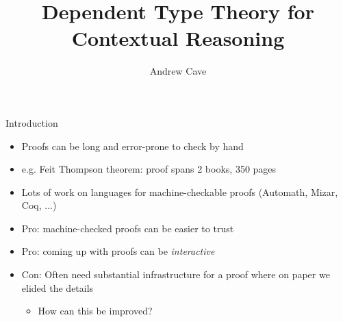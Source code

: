 \documentclass[usenames,dvipsnames]{beamer}
\author{Andrew Cave}
\title[{\makebox[.45\paperwidth]{Dependent Type Theory for Contextual Reasoning\hfill%
       \insertframenumber/\inserttotalframenumber}}]{Dependent Type Theory for Contextual Reasoning}
\begin{document}
\begin{frame}
\titlepage
\end{frame}

\begin{frame}{Introduction}
\begin{itemize}
\item Proofs can be long and error-prone to check by hand
\pause
\item e.g. Feit Thompson theorem: proof spans 2 books, 350 pages
\pause
\item Lots of work on languages for machine-checkable proofs (Automath, Mizar, Coq, ...)
\pause \item {\color{green} Pro:} machine-checked proofs can be easier to trust
\pause \item {\color{green} Pro:} coming up with proofs can be \emph{interactive}
\pause \item {\color{red} Con:} Often need substantial infrastructure for a proof where on paper we elided the details
\begin{itemize}
\item How can this be improved?
\end{itemize}
\end{itemize}
\end{frame}
\end{document}

